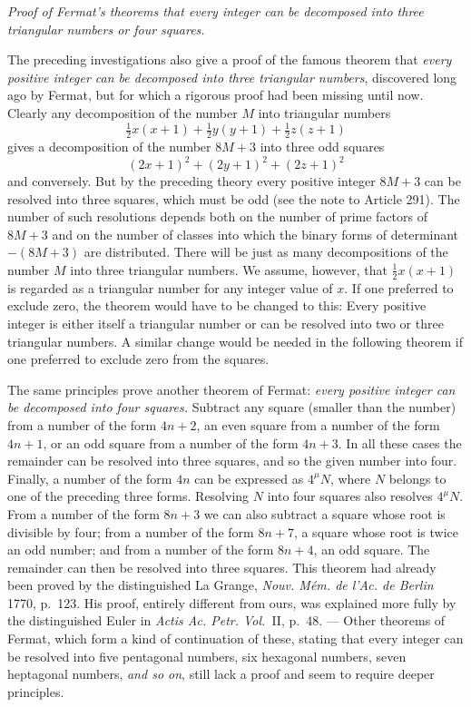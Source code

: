 \begin{center}\textit{Proof of Fermat's theorems that every integer can be decomposed into three triangular numbers or four squares.}\end{center}
The preceding investigations also give a proof of the famous theorem
that \textit{every positive integer can be decomposed into three
triangular numbers}, discovered long ago by Fermat, but for which a
rigorous proof had been missing until now. Clearly any decomposition
of the number \(M\) into triangular numbers
\[
\tfrac12 x(x+1)+\tfrac12 y(y+1)+\tfrac12 z(z+1)
\]
gives a decomposition of the number \(8M+3\) into three odd squares
\[
(2x+1)^2+(2y+1)^2+(2z+1)^2
\]
and conversely. But by the preceding theory every positive integer
\(8M+3\) can be resolved into three squares, which must be odd (see
the note to Article 291). The number of such resolutions depends
both on the number of prime factors of \(8M+3\) and on the number
of classes into which the binary forms of determinant \(-(8M+3)\) are
distributed. There will be just as many decompositions of the number
\(M\) into three triangular numbers. We assume, however, that
\(\frac12 x(x+1)\) is regarded as a triangular number for any integer value
of \(x\). If one preferred to exclude zero, the theorem would
have to be changed to this: Every positive integer is either itself
a triangular number or can be resolved into two or three triangular
numbers. A similar change would be needed in the following theorem
if one preferred to exclude zero from the squares.

The same principles prove another theorem of Fermat: \textit{every
positive integer can be decomposed into four squares.} Subtract
any square (smaller than the number) from a number of the form
\(4n+2\), an even square from a number of the form
\(4n+1\), or an odd square from a number of the form \(4n+3\). In
all these cases the remainder can be resolved into three squares,
and so the given number into four. Finally, a number of the form
\(4n\) can be expressed as \(4^{\mu}N\), where \(N\) belongs to
one of the preceding three forms. Resolving \(N\) into four
squares also resolves \(4^{\mu}N\). From a number of the form \(8n+3\)
we can also subtract a square whose root is divisible by four; from
a number of the form \(8n+7\), a square whose root is twice an odd
number; and from a number of the form \(8n+4\), an odd square.
The remainder can then be resolved into three squares. This theorem
had already been proved by the distinguished La Grange, \textit{Nouv.
Mém. de l'Ac. de Berlin} 1770, p.\ 123. His proof, entirely different
from ours, was explained more fully by the distinguished Euler in
\textit{Actis Ac. Petr. Vol.}\ II, p.\ 48. --- Other theorems of Fermat,
which form a kind of continuation of these, stating that every integer
can be resolved into five pentagonal numbers, six hexagonal numbers,
seven heptagonal numbers, \textit{and so on}, still lack a proof
and seem to require deeper principles.
